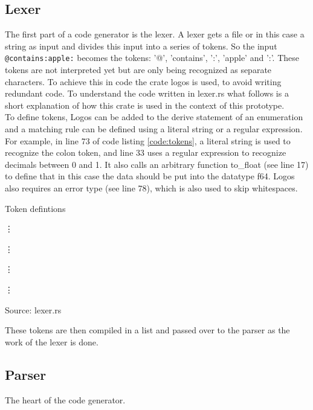 \subsection{Lexer}
The first part of a code generator is the lexer. A lexer gets a file or in this case a string as input and divides this input into a series of tokens. So the input \lstinline[language=Fulltext-Search]$@contains:apple:$ becomes the tokens: '@', 'contains', ':', 'apple' and ':'. These tokens are not interpreted yet but are only being recognized as separate characters. To achieve this in code the crate logos is used, to avoid writing redundant code. To understand the code written in lexer.rs what follows is a short explanation of how this crate is used in the context of this prototype.\\
To define tokens, Logos can be added to the derive statement of an enumeration and a matching rule can be defined using a literal string or a regular expression. For example, in line 73 of code listing \ref{code:tokens}, a literal string is used to recognize the colon token, and line 33 uses a regular expression to recognize decimals between 0 and 1. It also calls an arbitrary function to\_float (see line 17) to define that in this case the data should be put into the datatype f64. Logos also requires an error type (see line 78), which is also used to skip whitespaces. \parencite[cf.][n.p.]{hirsz_logos_2022}
\begin{mycapcode}[H]
    \caption{Token defintions}
    \label{code:tokens}
    
    \vdots
    
    \vdots
    
    \vdots
    
    \vdots
    
    \centerline{Source: lexer.rs}
\end{mycapcode}
These tokens are then compiled in a list and passed over to the parser as the work of the lexer is done.
\subsection{Parser}
The heart of the code generator.